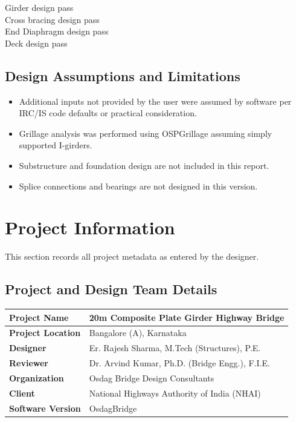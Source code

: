 \documentclass[12pt,a4paper]{report}
\numberwithin{table}{chapter}
\numberwithin{figure}{chapter}
\begin{document}
\noindent Girder design pass \\
Cross bracing design pass \\
End Diaphragm design pass \\
Deck design pass

\section*{Design Assumptions and Limitations}
\label{sec:assumptions}

\begin{itemize}
\item Additional inputs not provided by the user were assumed by software per IRC/IS code defaults or practical consideration.
\item Grillage analysis was performed using OSPGrillage assuming simply supported I-girders.
\item Substructure and foundation design are not included in this report.
\item Splice connections and bearings are not designed in this version.
\end{itemize}

\titleformat{\chapter}[block]{\normalfont\Large\bfseries\centering}{\thechapter}{1em}{}
\titlespacing*{\chapter}{0pt}{-30pt}{10pt}


\chapter{Project Information}

This section records all project metadata as entered by the designer.

\section{Project and Design Team Details}
\label{sec:project-details}

\begin{tabular}{|L{5.5cm}|L{8.5cm}|}
\hline
\textbf{Project Name} & 20m Composite Plate Girder Highway Bridge \\
\hline
\textbf{Project Location} & Bangalore (A), Karnataka \\
\hline
\textbf{Designer} & Er. Rajesh Sharma, M.Tech (Structures), P.E. \\
\hline
\textbf{Reviewer} & Dr. Arvind Kumar, Ph.D. (Bridge Engg.), F.I.E. \\
\hline
\textbf{Organization} & Osdag Bridge Design Consultants \\
\hline
\textbf{Client} & National Highways Authority of India (NHAI) \\
\hline
\textbf{Software Version} & OsdagBridge \\
\hline
\end{tabular}
\end{document}
